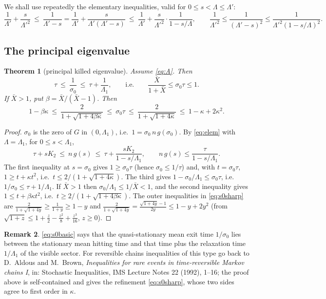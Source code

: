 \documentclass[11pt,a4paper]{article}
\newcommand{\Xb}{\bar X}
\theoremstyle{plain}
\newtheorem{theorem}{Theorem}[section]
\theoremstyle{definition}
\newtheorem{remark}[theorem]{Remark}
\numberwithin{equation}{section}
\begin{document}
We shall use repeatedly the elementary inequalities, valid for $0\le s<\Lambda\le\Lambda'$:
\begin{equation}\label{eq:elem}
\frac1{\Lambda'}+\frac s{\Lambda'^2}\ \le\ \frac1{\Lambda'-s}=\frac1{\Lambda'}+\frac{s}{\Lambda'(\Lambda'-s)}\ \le\ \frac1{\Lambda'}+\frac{s}{\Lambda'^2}\cdot\frac1{1-s/\Lambda},\qquad
\frac1{\Lambda'^2}\le\frac1{(\Lambda'-s)^2}\le\frac1{\Lambda'^2(1-s/\Lambda)^2}.
\end{equation}

\subsection{The principal eigenvalue}

\begin{theorem}[principal killed eigenvalue]\label{thm:sigma0}
Assume \eqref{eq:A}. Then
\begin{equation}\label{eq:s0basic}
\tau\ \le\ \frac1{\sigma_0}\ \le\ \tau+\frac1{\Lambda_1},\qquad\text{i.e.}\qquad \frac{\Xb}{1+\Xb}\le\sigma_0\tau\le1 .
\end{equation}
If $\Xb>1$, put $\beta=\Xb/(\Xb-1)$. Then
\begin{equation}\label{eq:s0sharp}
1-\beta\kappa\ \le\ \frac{2}{1+\sqrt{1+4\beta\kappa}}\ \le\ \sigma_0\tau\ \le\ \frac{2}{1+\sqrt{1+4\kappa}}\ \le\ 1-\kappa+2\kappa^2 .
\end{equation}
\end{theorem}
\begin{proof}
$\sigma_0$ is the zero of $G$ in $(0,\Lambda_1)$, i.e.\ $1=\sigma_0\,n\,g(\sigma_0)$. By \eqref{eq:elem} with $\Lambda=\Lambda_1$, for $0\le s<\Lambda_1$,
\[
\tau+sK_2\ \le\ n\,g(s)\ \le\ \tau+\frac{sK_2}{1-s/\Lambda_1},\qquad n\,g(s)\le\frac{\tau}{1-s/\Lambda_1}.
\]
The first inequality at $s=\sigma_0$ gives $1\ge\sigma_0\tau$ (hence $\sigma_0\le1/\tau$) and, with $t=\sigma_0\tau$, $1\ge t+\kappa t^2$, i.e.\ $t\le 2/(1+\sqrt{1+4\kappa})$. The third gives $1-\sigma_0/\Lambda_1\le\sigma_0\tau$, i.e.\ $1/\sigma_0\le\tau+1/\Lambda_1$. If $\Xb>1$ then $\sigma_0/\Lambda_1\le1/\Xb<1$, and the second inequality gives $1\le t+\beta\kappa t^2$, i.e.\ $t\ge2/(1+\sqrt{1+4\beta\kappa})$. The outer inequalities in \eqref{eq:s0sharp} are $\frac2{1+\sqrt{1+4y}}\ge\frac1{1+y}\ge1-y$ and $\frac{2}{1+\sqrt{1+4y}}=\frac{\sqrt{1+4y}-1}{2y}\le1-y+2y^2$ (from $\sqrt{1+z}\le1+\frac z2-\frac{z^2}8+\frac{z^3}{16}$, $z\ge0$).
\end{proof}

\begin{remark}
\eqref{eq:s0basic} says that the quasi-stationary mean exit time $1/\sigma_0$ lies between the stationary mean hitting time and that time plus the relaxation time $1/\Lambda_1$ of the visible sector. For reversible chains inequalities of this type go back to D.~Aldous and M.~Brown, \emph{Inequalities for rare events in time-reversible Markov chains I}, in: Stochastic Inequalities, IMS Lecture Notes 22 (1992), 1--16; the proof above is self-contained and gives the refinement \eqref{eq:s0sharp}, whose two sides agree to first order in $\kappa$.
\end{remark}
\end{document}
